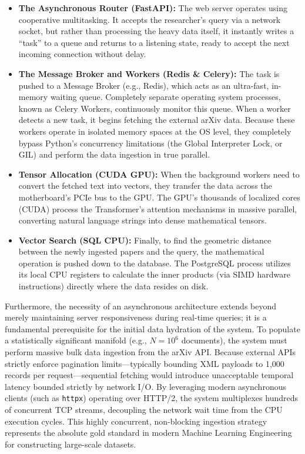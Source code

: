 \begin{itemize}
    \item \textbf{The Asynchronous Router (FastAPI):} The web server operates using cooperative multitasking. It accepts the researcher's query via a network socket, but rather than processing the heavy data itself, it instantly writes a ``task'' to a queue and returns to a listening state, ready to accept the next incoming connection without delay.
    \item \textbf{The Message Broker and Workers (Redis \& Celery):} The task is pushed to a Message Broker (e.g., Redis), which acts as an ultra-fast, in-memory waiting queue. Completely separate operating system processes, known as Celery Workers, continuously monitor this queue. When a worker detects a new task, it begins fetching the external arXiv data. Because these workers operate in isolated memory spaces at the OS level, they completely bypass Python's concurrency limitations (the Global Interpreter Lock, or GIL) and perform the data ingestion in true parallel.
    \item \textbf{Tensor Allocation (CUDA GPU):} When the background workers need to convert the fetched text into vectors, they transfer the data across the motherboard's PCIe bus to the GPU. The GPU's thousands of localized cores (CUDA) process the Transformer's attention mechanisms in massive parallel, converting natural language strings into dense mathematical tensors.
    \item \textbf{Vector Search (SQL CPU):} Finally, to find the geometric distance between the newly ingested papers and the query, the mathematical operation is pushed down to the database. The PostgreSQL process utilizes its local CPU registers to calculate the inner products (via SIMD hardware instructions) directly where the data resides on disk.
\end{itemize}

Furthermore, the necessity of an asynchronous architecture extends beyond merely maintaining server responsiveness during real-time queries; it is a fundamental prerequisite for the initial data hydration of the system. To populate a statistically significant manifold (e.g., $N = 10^6$ documents), the system must perform massive bulk data ingestion from the arXiv API. Because external APIs strictly enforce pagination limits---typically bounding XML payloads to 1,000 records per request---sequential fetching would introduce unacceptable temporal latency bounded strictly by network I/O. By leveraging modern asynchronous clients (such as \texttt{httpx}) operating over HTTP/2, the system multiplexes hundreds of concurrent TCP streams, decoupling the network wait time from the CPU execution cycles. This highly concurrent, non-blocking ingestion strategy represents the absolute gold standard in modern Machine Learning Engineering for constructing large-scale datasets.

